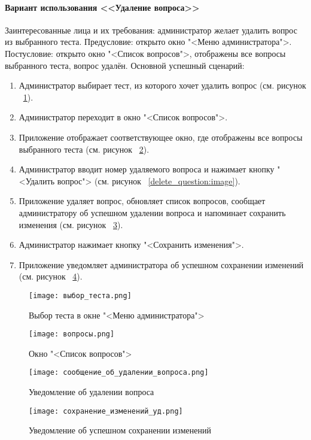 \paragraph{Вариант использования <<Удаление вопроса>>}

Заинтересованные лица и их требования: администратор желает удалить вопрос из выбранного теста.
\newline Предусловие: открыто окно "<Меню администратора">.
\newline Постусловие: открыто окно "<Список вопросов">, отображены все вопросы выбранного теста, вопрос удалён.
\newline Основной успешный сценарий:
\begin{enumerate}
	\item Администратор выбирает тест, из которого хочет удалить вопрос (см. рисунок ~\ref{select_test:image}).
	\item Администратор переходит в окно "<Список вопросов">.
	\item Приложение отображает соответствующее окно, где отображены все вопросы выбранного теста (см. рисунок ~\ref{questions_window:image}).
	\item Администратор вводит номер удаляемого вопроса и нажимает кнопку "<Удалить вопрос"> (см. рисунок ~\ref{delete_question:image}).
	\item Приложение удаляет вопрос, обновляет список вопросов, сообщает администратору об успешном удалении вопроса и напоминает сохранить изменения (см. рисунок ~\ref{deleting_complete:image}).
	\item Администратор нажимает кнопку "<Сохранить изменения">.
	\item Приложение уведомляет администратора об успешном сохранении изменений (см. рисунок ~\ref{save_notification:image}).
\end{enumerate}

\begin{figure}[H]
	\centering
	\texttt{[image: выбор\_теста.png]}
	\caption{Выбор теста в окне "<Меню администратора">}
	\label{select_test:image}
\end{figure}
\begin{figure}[H]
	\centering
	\texttt{[image: вопросы.png]}
	\caption{Окно "<Список вопросов">}
	\label{questions_window:image}
\end{figure}
\begin{figure}[H]
	\centering
	\texttt{[image: сообщение\_об\_удалении\_вопроса.png]}
	\caption{Уведомление об удалении вопроса}
	\label{deleting_complete:image}
\end{figure}
\begin{figure}[H]
	\centering
	\texttt{[image: сохранение\_изменений\_уд.png]}
	\caption{Уведомление об успешном сохранении изменений}
	\label{save_notification:image}
\end{figure}


